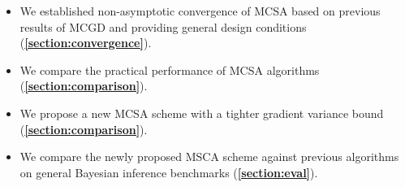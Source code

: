 \begin{itemize}[noitemsep]
\item[\ding{228}] We established non-asymptotic convergence of MCSA based on previous results of MCGD and providing general design conditions (\textbf{\cref{section:convergence}}).
\item[\ding{228}] We compare the practical performance of MCSA algorithms (\textbf{\cref{section:comparison}}).
\item[\ding{228}] We propose a new MCSA scheme with a tighter gradient variance bound (\textbf{\cref{section:comparison}}).
\item[\ding{228}] We compare the newly proposed MSCA scheme against previous algorithms on general Bayesian inference benchmarks (\textbf{\cref{section:eval}}).
\end{itemize}
\vspace{-0.05in}

